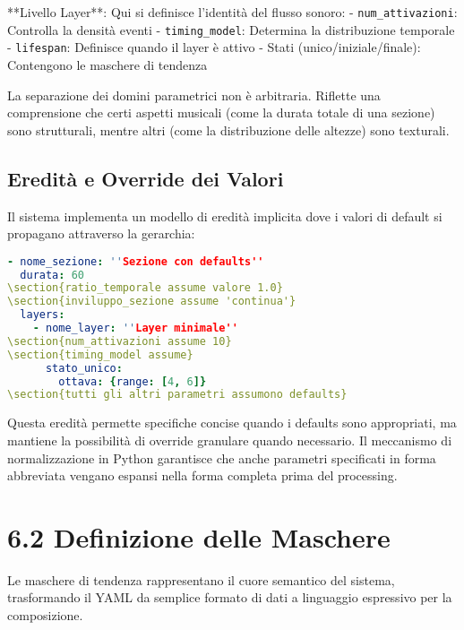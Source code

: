 **Livello Layer**: Qui si definisce l'identità del flusso sonoro:
- \texttt{num\_attivazioni}: Controlla la densità eventi
- \texttt{timing\_model}: Determina la distribuzione temporale
- \texttt{lifespan}: Definisce quando il layer è attivo
- Stati (unico/iniziale/finale): Contengono le maschere di tendenza

La separazione dei domini parametrici non è arbitraria. Riflette una comprensione che certi aspetti musicali (come la durata totale di una sezione) sono strutturali, mentre altri (come la distribuzione delle altezze) sono texturali.
\subsection{Eredità e Override dei Valori}
Il sistema implementa un modello di eredità implicita dove i valori di default si propagano attraverso la gerarchia:

\begin{lstlisting}[language=Yaml]
- nome_sezione: ''Sezione con defaults''
  durata: 60
\section{ratio_temporale assume valore 1.0}
\section{inviluppo_sezione assume 'continua'}
  layers:
    - nome_layer: ''Layer minimale''
\section{num_attivazioni assume 10}
\section{timing_model assume}
      stato_unico:
        ottava: {range: [4, 6]}
\section{tutti gli altri parametri assumono defaults}
\end{lstlisting}

Questa eredità permette specifiche concise quando i defaults sono appropriati, ma mantiene la possibilità di override granulare quando necessario. Il meccanismo di normalizzazione in Python garantisce che anche parametri specificati in forma abbreviata vengano espansi nella forma completa prima del processing.
\section{6.2 Definizione delle Maschere}
Le maschere di tendenza rappresentano il cuore semantico del sistema, trasformando il YAML da semplice formato di dati a linguaggio espressivo per la composizione.
